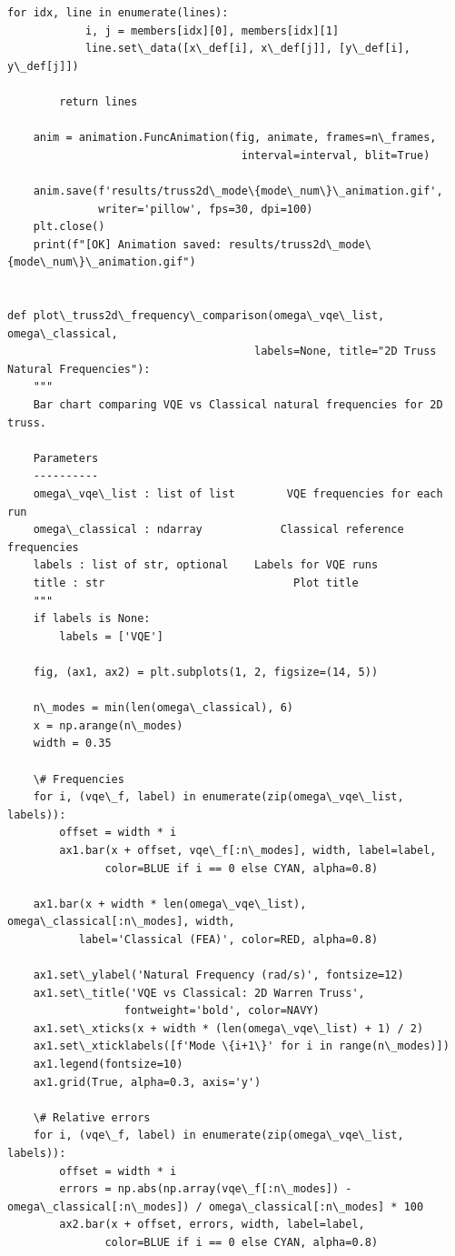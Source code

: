 \documentclass[12pt, a4paper]{article}
\begin{document}
\begin{lstlisting}[style=codestyle, caption={{visualize_truss2d.py --- 2D Warren Truss Visualizations}}]
        for idx, line in enumerate(lines):
            i, j = members[idx][0], members[idx][1]
            line.set\_data([x\_def[i], x\_def[j]], [y\_def[i], y\_def[j]])

        return lines

    anim = animation.FuncAnimation(fig, animate, frames=n\_frames,
                                    interval=interval, blit=True)

    anim.save(f'results/truss2d\_mode\{mode\_num\}\_animation.gif',
              writer='pillow', fps=30, dpi=100)
    plt.close()
    print(f"[OK] Animation saved: results/truss2d\_mode\{mode\_num\}\_animation.gif")


def plot\_truss2d\_frequency\_comparison(omega\_vqe\_list, omega\_classical,
                                      labels=None, title="2D Truss Natural Frequencies"):
    """
    Bar chart comparing VQE vs Classical natural frequencies for 2D truss.

    Parameters
    ----------
    omega\_vqe\_list : list of list        VQE frequencies for each run
    omega\_classical : ndarray            Classical reference frequencies
    labels : list of str, optional    Labels for VQE runs
    title : str                             Plot title
    """
    if labels is None:
        labels = ['VQE']

    fig, (ax1, ax2) = plt.subplots(1, 2, figsize=(14, 5))

    n\_modes = min(len(omega\_classical), 6)
    x = np.arange(n\_modes)
    width = 0.35

    \# Frequencies
    for i, (vqe\_f, label) in enumerate(zip(omega\_vqe\_list, labels)):
        offset = width * i
        ax1.bar(x + offset, vqe\_f[:n\_modes], width, label=label,
               color=BLUE if i == 0 else CYAN, alpha=0.8)

    ax1.bar(x + width * len(omega\_vqe\_list), omega\_classical[:n\_modes], width,
           label='Classical (FEA)', color=RED, alpha=0.8)

    ax1.set\_ylabel('Natural Frequency (rad/s)', fontsize=12)
    ax1.set\_title('VQE vs Classical: 2D Warren Truss',
                  fontweight='bold', color=NAVY)
    ax1.set\_xticks(x + width * (len(omega\_vqe\_list) + 1) / 2)
    ax1.set\_xticklabels([f'Mode \{i+1\}' for i in range(n\_modes)])
    ax1.legend(fontsize=10)
    ax1.grid(True, alpha=0.3, axis='y')

    \# Relative errors
    for i, (vqe\_f, label) in enumerate(zip(omega\_vqe\_list, labels)):
        offset = width * i
        errors = np.abs(np.array(vqe\_f[:n\_modes]) - omega\_classical[:n\_modes]) / omega\_classical[:n\_modes] * 100
        ax2.bar(x + offset, errors, width, label=label,
               color=BLUE if i == 0 else CYAN, alpha=0.8)


\end{lstlisting}
\end{document}
